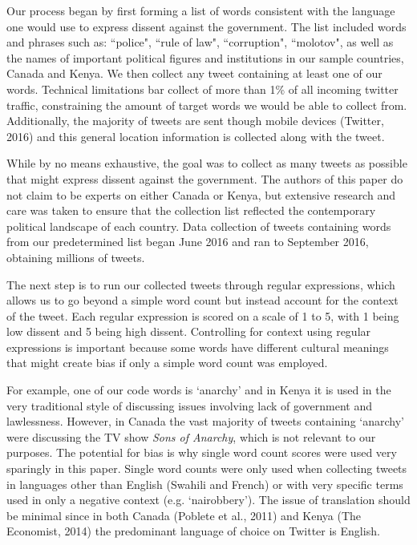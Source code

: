 \documentclass[12pt]{article}
\begin{document}
\begin{spacing}{1.5}


Our process began by first forming a list of words consistent with the language one would use to express dissent against the government. The list included words and phrases such as: ``police", ``rule of law", ``corruption", ``molotov", as well as the names of important political figures and institutions in our sample countries, Canada and Kenya. We then collect any tweet containing at least one of our words. Technical limitations bar collect of more than 1\% of all incoming twitter traffic, constraining the amount of target words we would be able to collect from. Additionally, the majority of tweets are sent though mobile devices (Twitter, 2016) and this general location information is collected along with the tweet. 

While by no means exhaustive, the goal was to collect as many tweets as possible that might express dissent against the government. The authors of this paper do not claim to be experts on either Canada or Kenya, but extensive research and care was taken to ensure that the collection list reflected the contemporary political landscape of each country. Data collection of tweets containing words from our predetermined list began June 2016 and ran to September 2016, obtaining millions of tweets.


The next step is to run our collected tweets through regular expressions, which allows us to go beyond a simple word count but instead account for the context of the tweet. Each regular expression is scored on a scale of 1 to 5, with 1 being low dissent and 5 being high dissent. Controlling for context using regular expressions is important because some words have different cultural meanings that might create bias if only a simple word count was employed. 

For example, one of our code words is `anarchy' and in Kenya it is used in the very traditional style of discussing issues involving lack of government and lawlessness. However, in Canada the vast majority of tweets containing `anarchy' were discussing the TV show \textit{Sons of Anarchy}, which is not relevant to our purposes. The potential for bias is why single word count scores were used very sparingly in this paper. Single word counts were only used when collecting tweets in languages other than English (Swahili and French) or with very specific terms used in only a negative context (e.g. `nairobbery'). The issue of translation should be minimal since in both Canada (Poblete et al., 2011) and Kenya (The Economist, 2014) the predominant language of choice on Twitter is English. 


\end{spacing}
\end{document}
